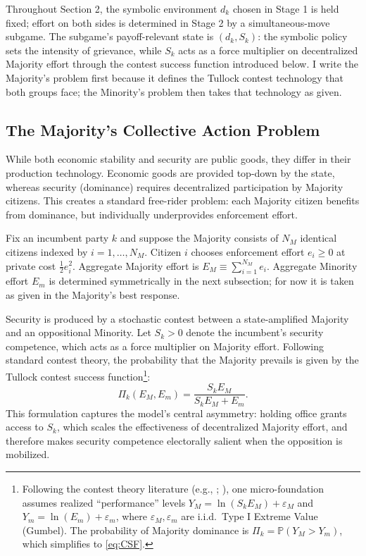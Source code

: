 \documentclass[11pt,twoside]{extarticle}
\begin{document}
Throughout Section 2, the symbolic environment $d_k$ chosen in Stage 1 is held fixed; effort on both sides is determined in Stage 2 by a simultaneous-move subgame. The subgame's payoff-relevant state is $(d_k, S_k)$: the symbolic policy sets the intensity of grievance, while $S_k$ acts as a force multiplier on decentralized Majority effort through the contest success function introduced below. I write the Majority's problem first because it defines the Tullock contest technology that both groups face; the Minority's problem then takes that technology as given.

\subsection{The Majority's Collective Action Problem}

While both economic stability and security are public goods, they differ in their production technology. Economic goods are provided top-down by the state, whereas security (dominance) requires decentralized participation by Majority citizens. This creates a standard free-rider problem: each Majority citizen benefits from dominance, but individually underprovides enforcement effort.

Fix an incumbent party $k$ and suppose the Majority consists of $N_M$ identical citizens indexed by $i=1,\dots,N_M$. Citizen $i$ chooses enforcement effort $e_i\ge 0$ at private cost $\frac{1}{2}e_i^2$. Aggregate Majority effort is $E_M\equiv\sum_{i=1}^{N_M} e_i$. Aggregate Minority effort $E_m$ is determined symmetrically in the next subsection; for now it is taken as given in the Majority's best response.

Security is produced by a stochastic contest between a state-amplified Majority and an oppositional Minority. Let $S_k>0$ denote the incumbent's security competence, which acts as a force multiplier on Majority effort. Following standard contest theory, the probability that the Majority prevails is given by the Tullock contest success function\footnote{Following the contest theory literature (e.g., \citet{skaperdasContestSuccessFunctions1996}; \citet{jiaStochasticDerivationRatio2008}), one micro-foundation assumes realized ``performance'' levels $Y_M=\ln(S_k E_M)+\varepsilon_M$ and $Y_m=\ln(E_m)+\varepsilon_m$, where $\varepsilon_M,\varepsilon_m$ are i.i.d.\ Type I Extreme Value (Gumbel). The probability of Majority dominance is $\Pi_k=\mathbb{P}(Y_M>Y_m)$, which simplifies to \autoref{eq:CSF}.}:
\begin{equation} \label{eq:CSF}
\Pi_k(E_M, E_m) = \frac{S_k E_M}{S_k E_M + E_m}.
\end{equation}
This formulation captures the model's central asymmetry: holding office grants access to $S_k$, which scales the effectiveness of decentralized Majority effort, and therefore makes security competence electorally salient when the opposition is mobilized.
\end{document}
